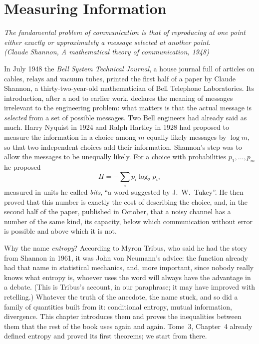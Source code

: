 \chapter{Measuring Information}\label{ch:entropy}

\begin{center}\itshape
The fundamental problem of communication is that of reproducing at one point\\
either exactly or approximately a message selected at another point.\\
\upshape(Claude Shannon, \emph{A mathematical theory of communication}, 1948)
\end{center}

In July 1948 the \emph{Bell System Technical Journal}, a house journal full of articles on cables, relays and vacuum tubes, printed the first half of a paper by Claude Shannon, a thirty-two-year-old mathematician of Bell Telephone Laboratories. Its introduction, after a nod to earlier work, declares the meaning of messages irrelevant to the engineering problem: what matters is that the actual message is \emph{selected} from a set of possible messages. Two Bell engineers had already said as much. Harry Nyquist in 1924 and Ralph Hartley in 1928 had proposed to measure the information in a choice among $m$ equally likely messages by $\log m$, so that two independent choices add their information. Shannon's step was to allow the messages to be unequally likely. For a choice with probabilities $p_1,\dots,p_m$ he proposed
\[
H=-\sum_ip_i\log_2p_i,
\]
measured in units he called \emph{bits}, ``a word suggested by J.~W.~Tukey''. He then proved that this number is exactly the cost of describing the choice, and, in the second half of the paper, published in October, that a noisy channel has a number of the same kind, its capacity, below which communication without error is possible and above which it is not.

Why the name \emph{entropy}? According to Myron Tribus, who said he had the story from Shannon in 1961, it was John von Neumann's advice: the function already had that name in statistical mechanics, and, more important, since nobody really knows what entropy is, whoever uses the word will always have the advantage in a debate. (This is Tribus's account, in our paraphrase; it may have improved with retelling.) Whatever the truth of the anecdote, the name stuck, and so did a family of quantities built from it: conditional entropy, mutual information, divergence. This chapter introduces them and proves the inequalities between them that the rest of the book uses again and again. Tome~3, Chapter~4 already defined entropy and proved its first theorems; we start from there.


